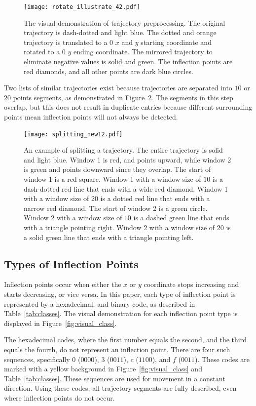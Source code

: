 \documentclass[preprint,12pt]{elsarticle}
\begin{document}
\begin{figure}[!ht]
    \centering
    \texttt{[image: rotate\_illustrate\_42.pdf]}
    \caption{The visual demonstration of trajectory preprocessing. The original trajectory is dash-dotted and light blue. The dotted and orange trajectory is translated to a $0$ $x$ and $y$ starting coordinate and rotated to a $0$ $y$ ending coordinate. The mirrored trajectory to eliminate negative values is solid and green. The inflection points are red diamonds, and all other points are dark blue circles.}
    \label{fig:visual_transform}
\end{figure}

Two lists of similar trajectories exist because trajectories are separated into $10$ or $20$ points segments, as demonstrated in Figure~\ref{fig:splitting_new_demo}. The segments in this step overlap, but this does not result in duplicate entries because different surrounding points mean inflection points will not always be detected.

\begin{figure}[!ht]
    \centering
    \texttt{[image: splitting\_new12.pdf]}
    \caption{An example of splitting a trajectory. The entire trajectory is solid and light blue. Window 1 is red, and points upward, while window 2 is green and points downward since they overlap. The start of window 1 is a red square. Window 1 with a window size of $10$ is a dash-dotted red line that ends with a wide red diamond. Window 1 with a window size of $20$ is a dotted red line that ends with a narrow red diamond. The start of window 2 is a green circle. Window 2 with a window size of $10$ is a dashed green line that ends with a triangle pointing right. Window 2 with a window size of $20$ is a solid green line that ends with a triangle pointing left.}
    \label{fig:splitting_new_demo}
\end{figure}

\subsection{Types of Inflection Points}

Inflection points occur when either the $x$ or $y$ coordinate stops increasing and starts decreasing, or vice versa. In this paper, each type of inflection point is represented by a hexadecimal, and binary code, as described in Table~\ref{tab:classes}. The visual demonstration for each inflection point type is displayed in Figure~\ref{fig:visual_class}.

The hexadecimal codes, where the first number equals the second, and the third equals the fourth, do not represent an inflection point. There are four such sequences, specifically $0$ ($0000$), $3$ ($0011$), $c$ ($1100$), and $f$ ($0011$). These codes are marked with a yellow background in Figure~\ref{fig:visual_class} and Table~\ref{tab:classes}. These sequences are used for movement in a constant direction. Using these codes, all trajectory segments are fully described, even where inflection points do not occur. 
\end{document}
